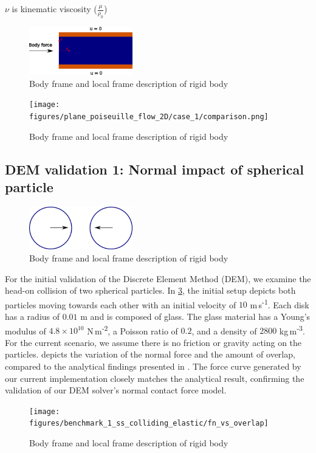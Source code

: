 \documentclass[preprint,12pt]{elsarticle}
\begin{document}
$\nu$ is kinematic viscosity ($\frac{\mu}{\rho_0}$)


\begin{figure}[!htpb]
  \centering
  \includegraphics[width=0.4\textwidth]{images/fluid_01_benchmark_poisuelle/poiseuille_schematic}
  \caption{Body frame and local frame description of rigid body}
  \label{fig:gloabl_body_frame_rb}
\end{figure}

\begin{figure}[!htpb]
  \centering
  \texttt{[image: figures/plane\_poiseuille\_flow\_2D/case\_1/comparison.png]}
  \caption{Body frame and local frame description of rigid body}
  \label{fig:gloabl_body_frame_rb}
\end{figure}


\FloatBarrier%
\subsection{DEM validation 1: Normal impact of spherical particle}
\label{sec:DEM_validation_1_normal_impact}

\begin{figure}[!htpb]
  \centering
  \includegraphics[width=0.4\textwidth]{images/results_dem_1_validation_particle_particle_impact/dem_01_head_on_schematic}
  \caption{Body frame and local frame description of rigid body}
  \label{fig:result:dem_1_schematic}
\end{figure}
For the initial validation of the Discrete Element Method (DEM), we examine
the head-on collision of two spherical particles. In
\cref{fig:result:dem_1_schematic}, the initial setup depicts both particles
moving towards each other with an initial velocity of $10$
m\,s\textsuperscript{-1}.  Each disk has a radius of $0.01$ m and is composed
of glass. The glass material has a Young's modulus of $4.8 \times 10^{10}$
N\,m\textsuperscript{-2}, a Poisson ratio of $0.2$, and a density of $2800$
kg\,m\textsuperscript{-3}.  For the current scenario, we assume there is no
friction or gravity acting on the particles.
 depicts the variation of the normal
force and the amount of overlap, compared to the analytical findings presented
in \citet{xxxx}. The force curve generated by our current implementation
closely matches the analytical result, confirming the validation of our DEM
solver's normal contact force model.
\begin{figure}[!htpb]
  \centering
  \texttt{[image: figures/benchmark\_1\_ss\_colliding\_elastic/fn\_vs\_overlap]}
  \caption{Body frame and local frame description of rigid body}
  \label{fig:result:dem_1_force_vs_overlap}
\end{figure}
\end{document}
